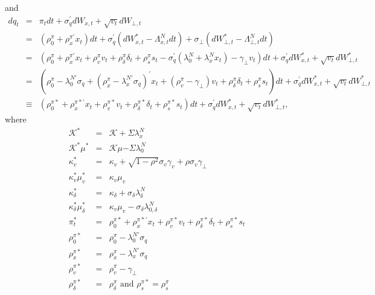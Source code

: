 \documentclass{article}
\begin{document}
and%
\begin{eqnarray*}
dq_{t} &=&\pi _{t}dt+\sigma _{q}^{\prime }dW_{x,t}+\sqrt{v_{t}}dW_{\bot ,t}
\\
&=&\left( \rho _{0}^{\pi }+\rho _{x}^{\pi \prime }x_{t}\right) dt+\sigma
_{q}^{\prime }\left( dW_{x,t}^{\ast }-\Lambda _{x,t}^{N}dt\right) +\sigma
_{\bot }\left( dW_{\bot ,t}^{\ast }-\Lambda _{\bot ,t}^{N}dt\right) \\
&=&\left( \rho _{0}^{\pi }+\rho _{x}^{\pi \prime }x_{t}+\rho _{v}^{\pi
}v_{t}+\rho _{\delta }^{\pi }\delta _{t}+\rho _{s}^{\pi }s_{t}-\sigma
_{q}^{\prime }\left( \lambda _{0}^{N}+\lambda _{x}^{N}x_{t}\right) -\gamma
_{\bot }v_{t}\right) dt+\sigma _{q}^{\prime }dW_{x,t}^{\ast }+\sqrt{v_{t}}%
dW_{\bot ,t}^{\ast } \\
&=&\left( \rho _{0}^{\pi }-\lambda _{0}^{N\prime }\sigma _{q}+\left( \rho
_{x}^{\pi }-\lambda _{x}^{N\prime }\sigma _{q}\right) ^{\prime }x_{t}+\left(
\rho _{v}^{\pi }-\gamma _{\bot }\right) v_{t}+\rho _{\delta }^{\pi }\delta
_{t}+\rho _{s}^{\pi }s_{t}\right) dt+\sigma _{q}^{\prime }dW_{x,t}^{\ast }+%
\sqrt{v_{t}}dW_{\bot ,t}^{\ast } \\
&\equiv &\left( \rho _{0}^{\pi \ast }+\rho _{x}^{\pi \ast \prime }x_{t}+\rho
_{v}^{\pi \ast }v_{t}+\rho _{\delta }^{\pi \ast }\delta _{t}+\rho _{s}^{\pi
\ast }s_{t}\right) dt+\sigma _{q}^{\prime }dW_{x,t}^{\ast }+\sqrt{v_{t}}%
dW_{\bot ,t}^{\ast },
\end{eqnarray*}%
where 
\begin{eqnarray*}
\mathcal{K}^{\ast } &=&\mathcal{K+}\Sigma \lambda _{x}^{N} \\
\mathcal{K}^{\ast }\mu ^{\ast } &=&\mathcal{K}\mu \mathcal{-}\Sigma \lambda
_{0}^{N} \\
\kappa _{v}^{\ast } &=&\kappa _{v}+\sqrt{1-\rho ^{2}}\sigma _{v}\gamma
_{v}+\rho \sigma _{v}\gamma _{\bot } \\
\kappa _{v}^{\ast }\mu _{v}^{\ast } &=&\kappa _{v}\mu _{v} \\
\kappa _{\delta }^{\ast } &=&\kappa _{\delta }+\sigma _{\delta }\lambda
_{\delta }^{N} \\
\kappa _{\delta }^{\ast }\mu _{\delta }^{\ast } &=&\kappa _{v}\mu
_{v}-\sigma _{\delta }\lambda _{0,\delta }^{N} \\
\pi _{t}^{\ast } &=&\rho _{0}^{\pi \ast }+\rho _{x}^{\pi \ast \prime
}x_{t}+\rho _{v}^{\pi \ast }v_{t}+\rho _{\delta }^{\pi \ast }\delta
_{t}+\rho _{s}^{\pi \ast }s_{t} \\
\rho _{0}^{\pi \ast } &=&\rho _{0}^{\pi }-\lambda _{0}^{N\prime }\sigma _{q}
\\
\rho _{x}^{\pi \ast } &=&\rho _{x}^{\pi }-\lambda _{x}^{N\prime }\sigma _{q}
\\
\rho _{v}^{\pi \ast } &=&\rho _{v}^{\pi }-\gamma _{\bot } \\
\rho _{\delta }^{\pi \ast } &=&\rho _{\delta }^{\pi }\text{ and }\rho
_{s}^{\pi \ast }=\rho _{s}^{\pi }
\end{eqnarray*}
\end{document}
